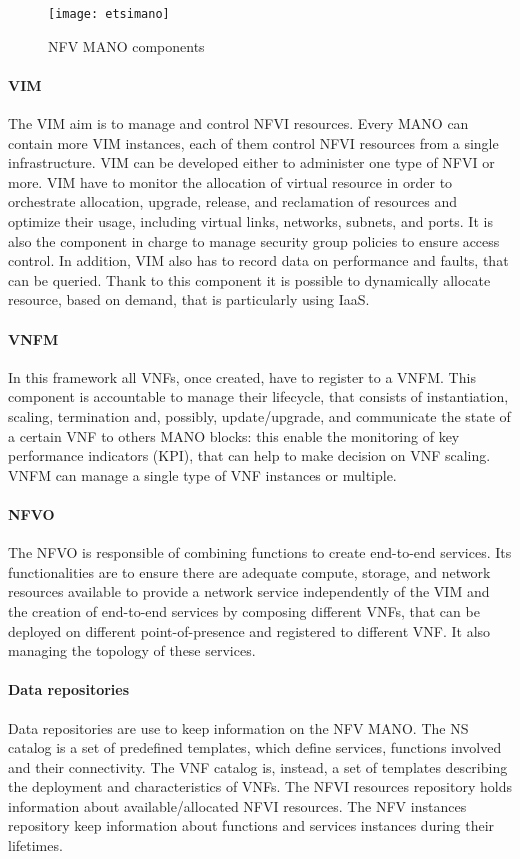 \begin{figure}
  \centering
  \texttt{[image: etsimano]}
  \caption{NFV MANO components}
  \label{chap:background:img:etsimano}
\end{figure}

\paragraph*{VIM}
The VIM aim is to manage and control NFVI resources. Every MANO can contain more VIM instances, each of them control NFVI resources from a single infrastructure. VIM can be developed either to administer one type of NFVI or more. VIM have to monitor the allocation of virtual resource in order to orchestrate allocation, upgrade, release, and reclamation of resources and optimize their usage, including virtual links, networks, subnets, and ports. It is also the component in charge to manage security group policies to ensure access control. In addition, VIM also has to record data on performance and faults, that can be queried. Thank to this component it is possible to dynamically allocate resource, based on demand, that is particularly using IaaS.

\paragraph*{VNFM} 
In this framework all VNFs, once created, have to register to a VNFM. This
component is accountable to manage their lifecycle, that consists of
instantiation, scaling, termination and, possibly, update/upgrade, and
communicate the state of a certain VNF to others MANO blocks: this enable the
monitoring of key performance indicators (KPI), that can help to make decision
on VNF scaling. VNFM can manage a single type of VNF instances or multiple.

\paragraph*{NFVO}
The NFVO is responsible of combining functions to create end-to-end services.
Its functionalities are to ensure there are adequate compute, storage, and
network resources available to provide a network service independently of the
VIM and the creation of end-to-end services by composing different VNFs, that
can be deployed on different point-of-presence and registered to different VNF.
It also managing the topology of these services. 

\paragraph*{Data repositories} Data repositories are use to keep information on
the NFV MANO. The NS catalog is a set of predefined templates, which define
services, functions involved and their connectivity. The VNF catalog is,
instead, a set of templates describing the deployment and characteristics of
VNFs. The NFVI resources repository holds information about available/allocated
NFVI resources. The NFV instances repository keep information about functions
and services instances during their lifetimes.

